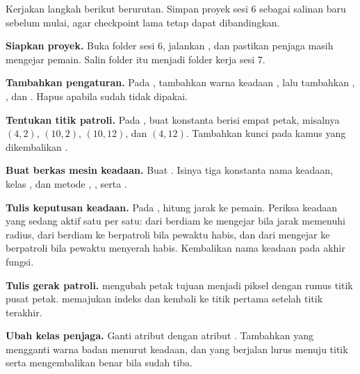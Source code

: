 
Kerjakan langkah berikut berurutan. Simpan proyek sesi 6 sebagai salinan baru
sebelum mulai, agar checkpoint lama tetap dapat dibandingkan.

\begin{langkah}
  \item \textbf{Siapkan proyek.} Buka folder sesi 6, jalankan
        , dan pastikan penjaga masih mengejar
        pemain. Salin folder itu menjadi folder kerja sesi 7.

  \item \textbf{Tambahkan pengaturan.} Pada , tambahkan warna
        keadaan , lalu tambahkan
        , ,
        dan . Hapus
         apabila sudah tidak dipakai.

  \item \textbf{Tentukan titik patroli.} Pada , buat konstanta
         berisi empat petak, misalnya
        $(4,2)$, $(10,2)$, $(10,12)$, dan $(4,12)$. Tambahkan kunci
         pada kamus yang dikembalikan .

  \item \textbf{Buat berkas mesin keadaan.} Buat .
        Isinya tiga konstanta nama keadaan, kelas , dan metode
        , , serta .

  \item \textbf{Tulis keputusan keadaan.} Pada , hitung jarak ke
        pemain. Periksa keadaan yang sedang aktif satu per satu: dari berdiam
        ke mengejar bila jarak memenuhi radius, dari berdiam ke berpatroli bila
        pewaktu habis, dan dari mengejar ke berpatroli bila pewaktu menyerah
        habis. Kembalikan nama keadaan pada akhir fungsi.

  \item \textbf{Tulis gerak patroli.}  mengubah petak tujuan
        menjadi piksel dengan rumus titik pusat petak. 
        memajukan indeks dan kembali ke titik pertama setelah titik terakhir.

  \item \textbf{Ubah kelas penjaga.} Ganti atribut  dengan
        atribut . Tambahkan  yang mengganti warna
        badan menurut keadaan, dan  yang berjalan lurus menuju
        titik serta mengembalikan benar bila sudah tiba.


\end{langkah}
